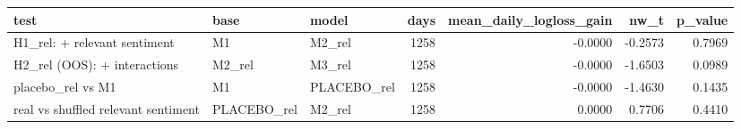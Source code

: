 \begin{tabular}{lllrrrr}
\toprule
test & base & model & days & mean\_daily\_logloss\_gain & nw\_t & p\_value \\
\midrule
H1\_rel: + relevant sentiment & M1 & M2\_rel & 1258 & -0.0000 & -0.2573 & 0.7969 \\
H2\_rel (OOS): + interactions & M2\_rel & M3\_rel & 1258 & -0.0000 & -1.6503 & 0.0989 \\
placebo\_rel vs M1 & M1 & PLACEBO\_rel & 1258 & -0.0000 & -1.4630 & 0.1435 \\
real vs shuffled relevant sentiment & PLACEBO\_rel & M2\_rel & 1258 & 0.0000 & 0.7706 & 0.4410 \\
\bottomrule
\end{tabular}
